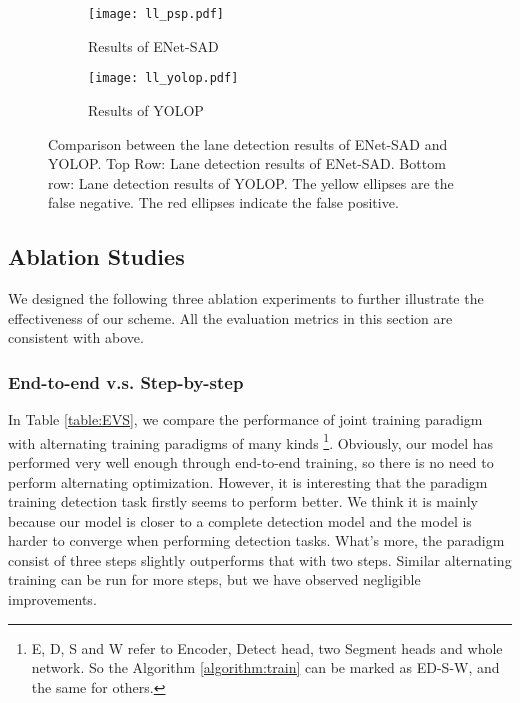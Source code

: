 \documentclass[10pt,twocolumn,letterpaper]{article}
\begin{document}
\begin{figure*}
\centering
\begin{subfigure}{\linewidth}
  \texttt{[image: ll\_psp.pdf]}
  \caption{Results of ENet-SAD}
\end{subfigure}

\begin{subfigure}{\linewidth}
  \texttt{[image: ll\_yolop.pdf]}
  \caption{Results of YOLOP}
\end{subfigure}
\caption{Comparison between the lane detection results of ENet-SAD and YOLOP. Top Row: Lane detection results of ENet-SAD. Bottom row: Lane detection results of YOLOP. The yellow ellipses are the false negative. The red  ellipses indicate the false positive.}
\label{fig:ll_vs}
\end{figure*}


\begin{table}
\begin{center}
\end{center}
\caption{Lane Detection Results: comparing the proposed YOLOP with state-of-the-art lane detection methods.}
\label{table:ll_result}
\end{table}


\subsection{Ablation Studies}
We designed the following three ablation experiments to further illustrate the effectiveness of our scheme. All the evaluation metrics in this section are consistent with above.

\subsubsection{End-to-end v.s. Step-by-step}
In Table \ref{table:EVS}, we compare the performance of joint training paradigm with alternating training paradigms of many kinds \footnote{E, D, S and W refer to Encoder, Detect head, two Segment heads and whole network. So the Algorithm \ref{algorithm:train} can be marked as ED-S-W, and the same for others.}. Obviously, our model has performed very well enough through end-to-end training, so there is no need to perform alternating optimization. However, it is interesting that the paradigm training detection task firstly seems to perform better. We think it is mainly because our model is closer to a complete detection model and the model is harder to converge when performing detection tasks. What's more, the paradigm consist of three steps slightly outperforms that with two steps. Similar alternating training can be run for more steps, but we have observed negligible improvements.
\end{document}
